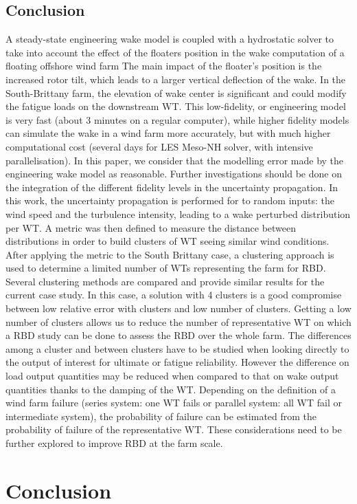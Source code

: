 \subsection{Conclusion}
A steady-state engineering wake model is coupled with a hydrostatic solver to take into account the effect of the floaters position in the wake computation of a floating offshore wind farm
The main impact of the floater's position is the increased rotor tilt, which leads to a larger vertical deflection of the wake. 
In the South-Brittany farm, the elevation of wake center is significant and could modify the fatigue loads on the downstream WT. 
This low-fidelity, or engineering model is very fast (about 3 minutes on a regular computer), while higher fidelity models can simulate the wake in a wind farm more accurately, but with much higher computational cost (several days for LES Meso-NH solver, with intensive parallelisation). 
In this paper, we consider that the modelling error made by the engineering wake model as reasonable. 
Further investigations should be done on the integration of the different fidelity levels in the uncertainty propagation. 
In this work, the uncertainty propagation is performed for to random inputs: the wind speed and the turbulence intensity, leading to a wake perturbed distribution per WT. 
A metric was then defined to measure the distance between distributions in order to build clusters of WT seeing similar wind conditions. 
After applying the metric to the South Brittany case, a clustering approach is used to determine a limited number of WTs representing the farm for RBD. 
Several clustering methods are compared and provide similar results for the current case study. In this case, a solution with 4 clusters is a good compromise between low relative error with clusters and low number of clusters. 
Getting a low number of clusters allows us to reduce the number of representative WT on which a RBD study can be done to assess the RBD over the whole farm. 
The differences among a cluster and between clusters have to be studied when looking directly to the output of interest for ultimate or fatigue reliability. 
However the difference on load output quantities may be reduced when compared to that on wake output quantities thanks to the damping of the WT. 
Depending on the definition of a wind farm failure (series system: one WT fails or parallel system: all WT fail or intermediate system), the probability of failure can be estimated from the probability of failure of the representative WT. 
These considerations need to be further explored to improve RBD at the farm scale. 


\section{Conclusion}

